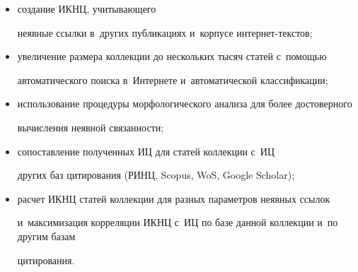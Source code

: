      \begin{itemize}

\item создание ИКНЦ, учитывающего 

неявные ссылки в~других публикациях и~корпусе ин\-тер\-нет-текстов;

\item увеличение размера коллекции до нескольких тысяч статей с~помощью 

автоматического поиска в~Интернете и~автоматической классификации;

\item использование процедуры морфологического анализа для более достоверного 

вычисления неявной связанности;

\item сопоставление полученных ИЦ для статей коллекции с~ИЦ 

других баз цитирования (РИНЦ, Scopus, WoS, Google Scholar);

\item расчет ИКНЦ статей коллекции для разных параметров неявных ссылок 

и~максимизация корреляции ИКНЦ с~ИЦ по базе данной коллекции и~по другим базам 

цитирования.

\end{itemize}



\vspace*{-3pt}

     


